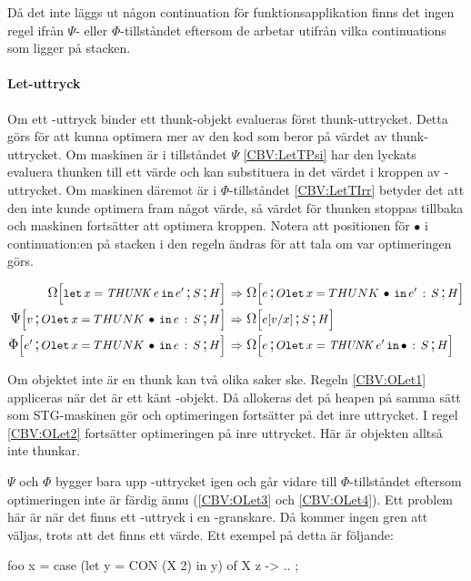 \documentclass[../Optimise]{subfiles}
\begin{document}
Då det inte läggs ut någon continuation för funktionsapplikation finns det ingen regel
ifrån $\Psi$- eller $\Phi$-tillståndet eftersom de arbetar utifrån vilka continuations
som ligger på stacken.



\paragraph{Let-uttryck}

Om ett -uttryck binder ett thunk-objekt evalueras först thunk-uttrycket. 
Detta görs för att kunna optimera mer av den kod som beror på värdet av thunk-uttrycket. Om
maskinen är i tillståndet $\Psi$ \eqref{CBV:LetTPsi} har den lyckats evaluera thunken till ett värde och kan
substituera in det värdet i kroppen av -uttrycket. Om maskinen däremot är i $\Phi$-tillståndet
\eqref{CBV:LetTIrr} betyder det att den inte kunde optimera fram något värde,
så värdet för thunken stoppas tillbaka och maskinen fortsätter att
optimera kroppen. Notera att positionen för $\bullet$ i continuation:en på stacken
i den regeln ändras för att tala om var optimeringen görs.

\begin{align}
\label{CBV:LetTOmg} \OMEGA SH{\eLet x{\THUNK e}{e'}}  \rulesep &\, \OMEGA{\oLet x{e'}S}He\\
\label{CBV:LetTPsi} \PSI{\oLet xeS}Hv  \rulesep &\, \OMEGA SH{e[v/x]} \\
\label{CBV:LetTIrr} \IRR{\oLet xeS}H{e'}  \rulesep &\, \OMEGA{\oLetObj x{\THUNK{e'}}S}He
\end{align}

Om objektet inte är en thunk kan två olika saker ske. Regeln \eqref{CBV:OLet1} appliceras när det är 
ett känt -objekt. Då allokeras det på heapen på samma sätt som STG-maskinen gör
och optimeringen fortsätter på det inre uttrycket. I regel \eqref{CBV:OLet2} 
fortsätter optimeringen på inre uttrycket. Här är objekten alltså
inte thunkar.

$\Psi$ och $\Phi$ bygger bara upp -uttrycket igen och går vidare till $\Phi$-tillståndet
eftersom optimeringen inte är färdig ännu (\eqref{CBV:OLet3} och \eqref{CBV:OLet4}). 
Ett problem här är när det finns ett -uttryck
i en -granskare. Då kommer ingen gren att väljas, trots att det finns ett värde. Ett
exempel på detta är följande:

\begin{codeEx}
foo x = case (let y = CON (X 2) in y) of
    { X z -> ..
    };
\end{codeEx} 
\end{document}
